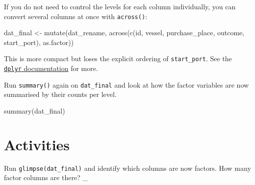 \documentclass[
  english,
  letterpaper,
]{book}
\newenvironment{Shaded}{\begin{snugshade}}{\end{snugshade}}
\newcommand{\FunctionTok}[1]{\textcolor[rgb]{0.28,0.35,0.67}{#1}}
\newcommand{\NormalTok}[1]{\textcolor[rgb]{0.00,0.23,0.31}{#1}}
\newcommand{\OtherTok}[1]{\textcolor[rgb]{0.00,0.23,0.31}{#1}}
\begin{document}
\begin{tcolorbox}[enhanced jigsaw, colframe=quarto-callout-note-color-frame, breakable, left=2mm, leftrule=.75mm, toptitle=1mm, rightrule=.15mm, opacitybacktitle=0.6, arc=.35mm, colback=white, title=\textcolor{quarto-callout-note-color}{\faInfo}\hspace{0.5em}{A quicker way for batch conversions}, coltitle=black, colbacktitle=quarto-callout-note-color!10!white, toprule=.15mm, bottomtitle=1mm, opacityback=0, titlerule=0mm, bottomrule=.15mm]

If you do not need to control the levels for each column individually,
you can convert several columns at once with \texttt{across()}:

\begin{Shaded}
\begin{Highlighting}[]
\NormalTok{dat\_final }\OtherTok{\textless{}{-}} \FunctionTok{mutate}\NormalTok{(dat\_rename,}
                    \FunctionTok{across}\NormalTok{(}\FunctionTok{c}\NormalTok{(id, vessel, purchase\_place, outcome, start\_port),}
\NormalTok{                           as.factor))}
\end{Highlighting}
\end{Shaded}

This is more compact but loses the explicit ordering of
\texttt{start\_port}. See the
\href{https://dplyr.tidyverse.org/reference/across.html}{\texttt{dplyr}
documentation} for more.

\end{tcolorbox}

Run \texttt{summary()} again on \texttt{dat\_final} and look at how the
factor variables are now summarised by their counts per level.

\begin{Shaded}
\begin{Highlighting}[]
\FunctionTok{summary}\NormalTok{(dat\_final)}
\end{Highlighting}
\end{Shaded}

\section{Activities}\label{activities}

\begin{tcolorbox}[enhanced jigsaw, colframe=quarto-callout-tip-color-frame, breakable, left=2mm, leftrule=.75mm, toptitle=1mm, rightrule=.15mm, opacitybacktitle=0.6, arc=.35mm, colback=white, title=\textcolor{quarto-callout-tip-color}{\faLightbulb}\hspace{0.5em}{Activity 1}, coltitle=black, colbacktitle=quarto-callout-tip-color!10!white, toprule=.15mm, bottomtitle=1mm, opacityback=0, titlerule=0mm, bottomrule=.15mm]

Run \texttt{glimpse(dat\_final)} and identify which columns are now
factors. How many factor columns are there? \_

\end{tcolorbox}
\end{document}
